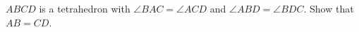 $ABCD$ is a tetrahedron with $\angle BAC = \angle ACD$ and $\angle ABD = \angle BDC$. Show that $AB = CD$.